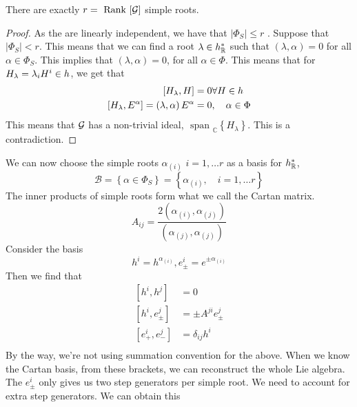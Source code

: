 \begin{claim}
 There are exactly $ r = \text{ Rank } [ \mathcal{ G } ] $ simple 
 roots. 
 \begin{proof}
	As the are linearly independent, we have 
	that $ | \Phi  _ S | \leq r $ . 
	Suppose that $ | \Phi _ S |  < r $. This means 
	that we can find a root $ \lambda \in h_{ \mathbb{R} } ^ * $ such that 
	$ \left(  \lambda , \alpha  \right)   = 0 $ for all $ \alpha \in \Phi  _ S $. 
	This implies that $ \left(  \lambda , \alpha  \right)   = 0 $, 
	for all $ \alpha \in \Phi  $. This means that 
	for $ H _ \lambda  = \lambda _ i H ^ i \in h $, 
	we get that 
	\begin{align*}
		\left[  H _ \lambda , H  \right]  &=  0 \forall H \in h  \\ 
		\left[  H _ \lambda ,  E^ \alpha  \right]   = \left(  \lambda , \alpha  \right)  E ^ \alpha &=  0 , 
		\quad \alpha \in \Phi   \\ 
	\end{align*}
	This means that $ \mathcal{ G } $ has a non-trivial ideal, $\text{ span }_{ \mathbb{ C } } 
	\left\{  H _{ \lambda }  \right\}  $. This is a contradiction.
 \end{proof}
\end{claim}
We can now choose the simple roots $ \alpha _{ \left(  i  \right)  } $ $ i = 1, \dots r $ 
as a basis for $ h _{\mathbb{R}  } ^ * $, 
\[
  \mathcal{ B }  = \left\{  \alpha \in \Phi  _ S   \right\}   = \left\{  \alpha _{ \left(  i  \right)  } 
  , \quad i =  1 , \dots r \right\}  
\]  The inner products of simple roots form what we 
call the Cartan matrix. 
\[
 A_{ ij } = \frac{ 2 ( \alpha _{ ( i ) } , \alpha _{ ( j ) }  ) }{ \left(  
 \alpha _{ ( j ) } , \alpha _{ ( j ) }\right)  }
\] Consider the basis 
\[
   h ^ i  = h ^{ \alpha _ \left( i   \right)  }, e ^ i_{ \pm }  = e ^{ \pm \alpha _{ ( i ) }}
\] Then we find that 
\begin{align*}
\left[  h ^ i , h ^ j  \right]  &=  0  \\ 
\left[  h ^ i , e_{ \pm } ^ j  \right]  &=  \pm A ^{ ji } e _{ \pm } ^ j  \\
\left[  e _{ + } ^ i , e _{ - } ^ j  \right]  & =  \delta _{ ij } h ^ i  \\
\end{align*}
By the way, we're not using summation convention 
for the above. 
When we know the Cartan basis, from these brackets, we can reconstruct the 
whole Lie algebra. The $ e ^{ i  }_{ \pm }  $ only gives 
us two step generators per simple root. We need to account 
for extra step generators. We can obtain this 
